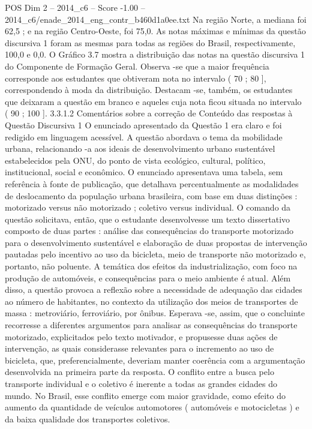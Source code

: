 \begin{textsample}{POS Dim 2 – 2014\_c6 – Score -1.00 – 2014\_c6/enade\_2014\_eng\_contr\_b460d1a0ee.txt}
Na região Norte, a mediana foi 62,5 ; e na região Centro-Oeste, foi 75,0.
As notas máximas e mínimas da questão discursiva 1 foram as mesmas para todas as regiões do Brasil, respectivamente, 100,0 e 0,0.
O Gráfico 3.7 mostra a distribuição das notas na questão discursiva 1 do Componente de Formação Geral.
Observa -se que a maior frequência corresponde aos estudantes que obtiveram nota no intervalo ( 70 ; 80 ], correspondendo à moda da distribuição.
Destacam -se, também, os estudantes que deixaram a questão em branco e aqueles cuja nota ficou situada no intervalo ( 90 ; 100 ]. 3.3.1.2 Comentários sobre a correção de Conteúdo das respostas à Questão Discursiva 1 O enunciado apresentado da Questão 1 era claro e foi redigido em linguagem acessível.
A questão abordava o tema da mobilidade urbana, relacionando -a aos ideais de desenvolvimento urbano sustentável estabelecidos pela ONU, do ponto de vista ecológico, cultural, político, institucional, social e econômico.
O enunciado apresentava uma tabela, sem referência à fonte de publicação, que detalhava percentualmente as modalidades de deslocamento da população urbana brasileira, com base em duas distinções : motorizado versus não motorizado ; coletivo versus individual.
O comando da questão solicitava, então, que o estudante desenvolvesse um texto dissertativo composto de duas partes : análise das consequências do transporte motorizado para o desenvolvimento sustentável e elaboração de duas propostas de intervenção pautadas pelo incentivo ao uso da bicicleta, meio de transporte não motorizado e, portanto, não poluente.
A temática dos efeitos da industrialização, com foco na produção de automóveis, e consequências para o meio ambiente é atual.
Além disso, a questão provoca a reflexão sobre a necessidade de adequação das cidades ao número de habitantes, no contexto da utilização dos meios de transportes de massa : metroviário, ferroviário, por ônibus.
Esperava -se, assim, que o concluinte recorresse a diferentes argumentos para analisar as consequências do transporte motorizado, explicitados pelo texto motivador, e propusesse duas ações de intervenção, as quais considerasse relevantes para o incremento ao uso de bicicleta, que, preferencialmente, deveriam manter coerência com a argumentação desenvolvida na primeira parte da resposta.
O conflito entre a busca pelo transporte individual e o coletivo é inerente a todas as grandes cidades do mundo.
No Brasil, esse conflito emerge com maior gravidade, como efeito do aumento da quantidade de veículos automotores ( automóveis e motocicletas ) e da baixa qualidade dos transportes coletivos.

\end{textsample}
